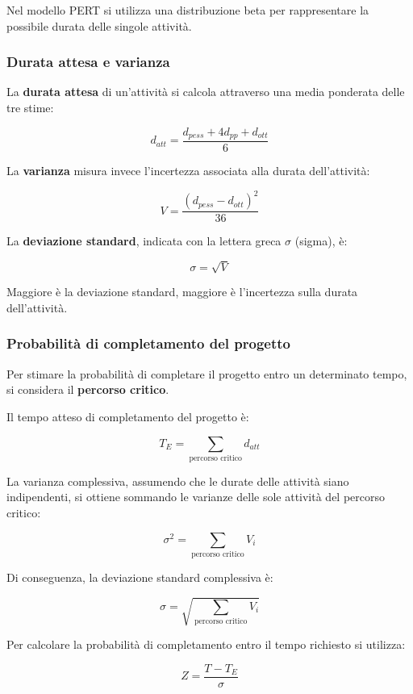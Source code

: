 \noindent Nel modello PERT si utilizza una distribuzione
beta per rappresentare la possibile durata delle
singole attività.

\subsubsection*{Durata attesa e varianza}

\noindent La \textbf{durata attesa} di un'attività si calcola
attraverso una media ponderata delle tre stime:

\[
\boxed{
d_{att}=
\frac{d_{pess}+4d_{pp}+d_{ott}}{6}
}
\]

\noindent La \textbf{varianza} misura invece l'incertezza
associata alla durata dell'attività:

\[
\boxed{
V=\frac{(d_{pess}-d_{ott})^2}{36}
}
\]

\noindent La \textbf{deviazione standard}, indicata con
la lettera greca $\sigma$ (sigma), è:

\[
\boxed{\sigma=\sqrt{V}}
\]

\noindent Maggiore è la deviazione standard, maggiore
è l'incertezza sulla durata dell'attività.

\subsubsection*{Probabilità di completamento del progetto}

\noindent Per stimare la probabilità di completare
il progetto entro un determinato tempo,
si considera il \textbf{percorso critico}.

\medskip

\noindent Il tempo atteso di completamento del progetto è:

\[
\boxed{
T_E=\sum_{\text{percorso critico}}d_{att}
}
\]

\noindent La varianza complessiva, assumendo che le durate
delle attività siano indipendenti, si ottiene sommando
le varianze delle sole attività del percorso critico:

\[
\boxed{
\sigma^2=\sum_{\text{percorso critico}}V_i
}
\]

\noindent Di conseguenza, la deviazione standard
complessiva è:

\[
\boxed{
\sigma=\sqrt{\sum_{\text{percorso critico}}V_i}
}
\]

\noindent Per calcolare la probabilità di completamento
entro il tempo richiesto si utilizza:

\[
\boxed{
Z=\frac{T-T_E}{\sigma}
}
\]

